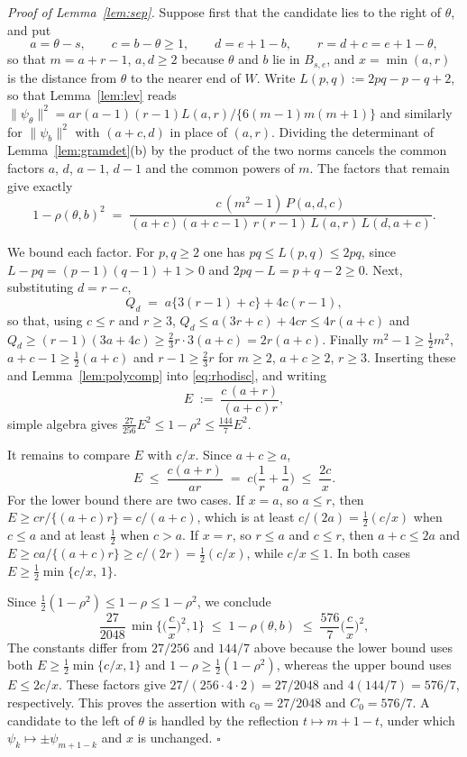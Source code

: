 \documentclass[12pt, a4paper]{article}
\newcommand{\qed}{\hfill$\square$}
\newenvironment{proof}[1][Proof]{\par\noindent\textit{#1.}\space}{\qed\par\medskip}
\begin{document}
\begin{proof}[Proof of Lemma~\ref{lem:sep}]
Suppose first that the candidate lies to the right of $\theta$, and put
\[
a = \theta - s, \qquad c = b - \theta \ge 1, \qquad d = e+1-b,
\qquad r = d + c = e+1-\theta ,
\]
so that $m = a + r - 1$, $a, d \ge 2$ because $\theta$ and $b$ lie in
$B_{s,e}$, and $x = \min(a,r)$ is the distance from $\theta$ to the nearer end
of $W$. Write $L(p,q) := 2pq - p - q + 2$, so that Lemma~\ref{lem:lev} reads
$\|\psi_\theta\|^2 = ar(a-1)(r-1)L(a,r)/\{6(m-1)m(m+1)\}$ and similarly for
$\|\psi_b\|^2$ with $(a+c,d)$ in place of $(a,r)$. Dividing the determinant of
Lemma~\ref{lem:gramdet}(b) by the product of the two norms cancels the common
factors $a$, $d$, $a-1$, $d-1$ and the common powers of $m$. The factors that
remain give exactly
\begin{equation}
\label{eq:rhodisc}
1 - \rho(\theta,b)^2 \;=\;
\frac{c\,(m^2-1)\,P(a,d,c)}
{(a+c)(a+c-1)\,r(r-1)\,L(a,r)\,L(d,a+c)} .
\end{equation}

We bound each factor. For $p,q \ge 2$ one has $pq \le L(p,q) \le 2pq$, since
$L - pq = (p-1)(q-1)+1 > 0$ and $2pq - L = p+q-2 \ge 0$. Next, substituting
$d = r-c$,
\[
Q_d \;=\; a\{3(r-1)+c\} + 4c(r-1) ,
\]
so that, using $c \le r$ and $r \ge 3$, $Q_d \le a(3r+c)+4cr \le 4r(a+c)$ and
$Q_d \ge (r-1)(3a+4c) \ge \tfrac23 r \cdot 3(a+c) = 2r(a+c)$. Finally
$m^2 - 1 \ge \tfrac12 m^2$, $a+c-1 \ge \tfrac12 (a+c)$ and
$r - 1 \ge \tfrac23 r$ for $m \ge 2$, $a+c\ge2$, $r \ge 3$. Inserting these and
Lemma~\ref{lem:polycomp} into \eqref{eq:rhodisc}, and writing
\[
E \;:=\; \frac{c\,(a+r)}{(a+c)r} ,
\]
simple algebra gives
$\tfrac{27}{256} E^2 \le 1-\rho^2 \le \tfrac{144}{7} E^2$.

It remains to compare $E$ with $c/x$. Since $a + c \ge a$,
\[
E \;\le\; \frac{c(a+r)}{ar} \;=\; c\Big(\frac1r + \frac1a\Big) \;\le\; \frac{2c}{x} .
\]
For the lower bound there are two cases. If $x = a$, so $a \le r$, then
$E \ge cr/\{(a+c)r\} = c/(a+c)$, which is at least $c/(2a) = \tfrac12 (c/x)$ when $c \le a$ and at least $\tfrac12$ when $c > a$. If $x = r$, so $r \le a$ and $c \le r$, then $a+c \le 2a$ and $E \ge ca/\{(a+c)r\} \ge c/(2r) = \tfrac12(c/x)$, while $c/x \le 1$. In both cases $E \ge \tfrac12\min\{c/x,\,1\}$.

Since $\tfrac12(1-\rho^2) \le 1-\rho \le 1-\rho^2$, we conclude
\[
\frac{27}{2048}\,\min\Big\{\Big(\frac{c}{x}\Big)^2, 1\Big\}
\;\le\; 1 - \rho(\theta,b) \;\le\;
\frac{576}{7}\Big(\frac{c}{x}\Big)^2 ,
\]
The constants differ from $27/256$ and $144/7$ above because the lower bound
uses both $E\ge\tfrac12\min\{c/x,1\}$ and
$1-\rho\ge\tfrac12(1-\rho^2)$, whereas the upper bound uses
$E\le2c/x$. These factors give $27/(256\cdot4\cdot2)=27/2048$ and
$4(144/7)=576/7$, respectively. This proves the assertion with
$c_0 = 27/2048$ and $C_0 = 576/7$. A candidate to
the left of $\theta$ is handled by the reflection $t \mapsto m+1-t$, under
which $\psi_k \mapsto \pm\psi_{m+1-k}$ and $x$ is unchanged.
\end{proof}
\end{document}
